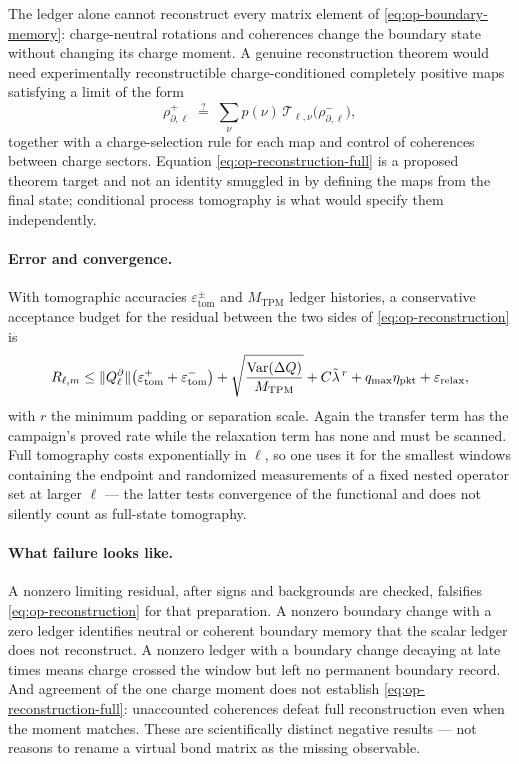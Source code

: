 The ledger alone cannot reconstruct every matrix element of
\eqref{eq:op-boundary-memory}: charge-neutral rotations and coherences change
the boundary state without changing its charge moment. A genuine
reconstruction theorem would need experimentally reconstructible
charge-conditioned completely positive maps satisfying a limit of the form
\begin{equation}
  \rho^{+}_{\partial,\ell}
  \;\overset{?}{=}\;\sum_\nu p(\nu)\,
     \mathcal{T}_{\ell,\nu}\bigl(\rho^{-}_{\partial,\ell}\bigr),
  \label{eq:op-reconstruction-full}
\end{equation}
together with a charge-selection rule for each map and control of coherences
between charge sectors. Equation \eqref{eq:op-reconstruction-full} is a
proposed theorem target and not an identity smuggled in by defining the maps
from the final state; conditional process tomography is what would specify
them independently.

\paragraph{Error and convergence.} With tomographic accuracies
$\varepsilon^{\pm}_{\mathrm{tom}}$ and $M_{\mathrm{TPM}}$ ledger histories, a
conservative acceptance budget for the residual between the two sides of
\eqref{eq:op-reconstruction} is
\begin{equation}
  R_{\ell,m}\le
  \lVert Q^{\partial}_\ell\rVert
    \bigl(\varepsilon^{+}_{\mathrm{tom}}+\varepsilon^{-}_{\mathrm{tom}}\bigr)
  +\sqrt{\frac{\operatorname{Var}(\Delta Q)}{M_{\mathrm{TPM}}}}
  +C\tilde{\lambda}^{\,r}+q_{\max}\eta_{\mathrm{pkt}}
  +\varepsilon_{\mathrm{relax}},
  \label{eq:op-reconstruction-budget}
\end{equation}
with $r$ the minimum padding or separation scale. Again the transfer term has
the campaign's proved rate while the relaxation term has none and must be
scanned. Full tomography costs exponentially in $\ell$, so one uses it for the
smallest windows containing the endpoint and randomized measurements of a fixed
nested operator set at larger $\ell$ --- the latter tests convergence of the
functional and does not silently count as full-state tomography.

\paragraph{What failure looks like.} A nonzero limiting residual, after signs
and backgrounds are checked, falsifies \eqref{eq:op-reconstruction} for that
preparation. A nonzero boundary change with a zero ledger identifies neutral or
coherent boundary memory that the scalar ledger does not reconstruct. A nonzero
ledger with a boundary change decaying at late times means charge crossed the
window but left no permanent boundary record. And agreement of the one charge
moment does not establish \eqref{eq:op-reconstruction-full}: unaccounted
coherences defeat full reconstruction even when the moment matches. These are
scientifically distinct negative results --- not reasons to rename a virtual
bond matrix as the missing observable.

